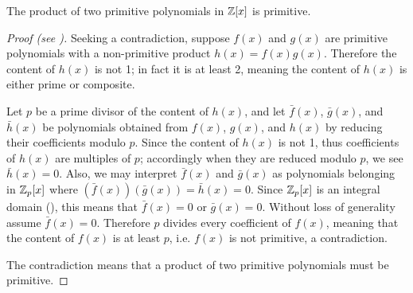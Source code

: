 \begin{lemma}[Gauss]\label{lemma-gauss-for-integer-coefficients}
    The product of two primitive polynomials in $\mathbb{Z}[x]$ is primitive.
\end{lemma}
\begin{proof}[Proof (see {\cite[p.~291]{gallian_2016}})]
    Seeking a contradiction, suppose $f(x)$ and $g(x)$ are primitive polynomials with a non-primitive product $h(x) = f(x)g(x)$. Therefore the content of $h(x)$ is not 1; in fact it is at least 2, meaning the content of $h(x)$ is either prime or composite.
    
    Let $p$ be a prime divisor of the content of $h(x)$, and let $\bar{f}(x)$, $\bar{g}(x)$, and $\bar{h}(x)$ be polynomials obtained from $f(x)$, $g(x)$, and $h(x)$ by reducing their coefficients modulo $p$. Since the content of $h(x)$ is not 1, thus coefficients of $h(x)$ are multiples of $p$; accordingly when they are reduced modulo $p$, we see $\bar{h}(x) = 0$. Also, we may interpret $\bar{f}(x)$ and $\bar{g}(x)$ as polynomials belonging in $\mathbb{Z}_p[x]$ where $(\bar{f}(x))(\bar{g}(x)) = \bar{h}(x) = 0$. Since $\mathbb{Z}_p[x]$ is an integral domain (), this means that $\bar{f}(x) = 0$ or $\bar{g}(x) = 0$. Without loss of generality assume $\bar{f}(x) = 0$. Therefore $p$ divides every coefficient of $f(x)$, meaning that the content of $f(x)$ is at least $p$, i.e. $f(x)$ is not primitive, a contradiction.

    The contradiction means that a product of two primitive polynomials must be primitive.
\end{proof}

